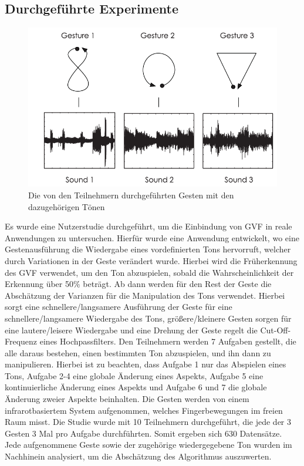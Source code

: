 \documentclass{llncs}
\begin{document}
\subsection{Durchgeführte Experimente}
\begin{figure}
\centering
\includegraphics[width=0.7\linewidth]{../Bilder/Fig10}
\caption{Die von den Teilnehmern durchgeführten Gesten mit den dazugehörigen Tönen}
\label{fig:Fig10}
\end{figure}
Es wurde eine Nutzerstudie durchgeführt, um die Einbindung von GVF in reale Anwendungen zu untersuchen. Hierfür wurde eine Anwendung entwickelt, wo eine Gestenausführung die Wiedergabe eines vordefinierten Tons hervorruft, welcher durch Variationen in der Geste verändert wurde. Hierbei wird die Früherkennung des GVF verwendet, um den Ton abzuspielen, sobald die Wahrscheinlichkeit der Erkennung über 50\% beträgt. Ab dann werden für den Rest der Geste die Abschätzung der Varianzen für die Manipulation des Tons verwendet. Hierbei sorgt eine schnellere/langsamere Ausführung der Geste für eine schnellere/langsamere Wiedergabe des Tons, größere/kleinere Gesten sorgen für eine lautere/leisere Wiedergabe und eine Drehung der Geste regelt die Cut-Off-Frequenz eines Hochpassfilters. Den Teilnehmern werden 7 Aufgaben gestellt, die alle daraus bestehen, einen bestimmten Ton abzuspielen, und ihn dann zu manipulieren. Hierbei ist zu beachten, dass Aufgabe 1 nur das Abspielen eines Tons, Aufgabe 2-4 eine globale Änderung eines Aspekts, Aufgabe 5 eine kontinuierliche Änderung eines Aspekts und Aufgabe 6 und 7 die globale Änderung zweier Aspekte beinhalten. Die Gesten werden von einem infrarotbasiertem System aufgenommen, welches Fingerbewegungen im freien Raum misst. Die Studie wurde mit 10 Teilnehmern durchgeführt, die jede der 3 Gesten 3 Mal pro Aufgabe durchführten. Somit ergeben sich 630 Datensätze. Jede aufgenommene Geste sowie der zugehörige wiedergegebene Ton wurden im Nachhinein analysiert, um die Abschätzung des Algorithmus auszuwerten.
\end{document}
